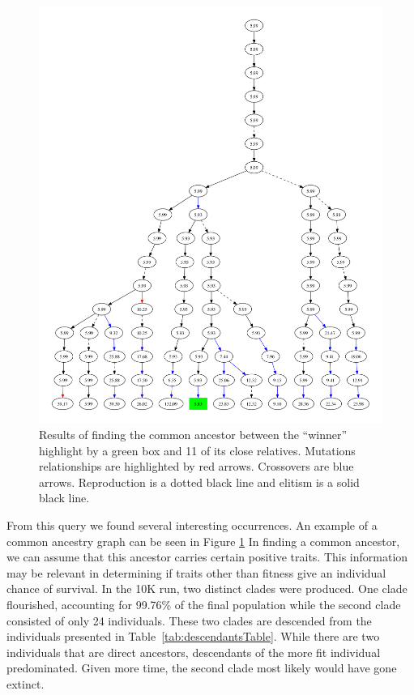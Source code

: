 \documentclass[12pt]{article}
\begin{document}
\begin{figure}[tb]
 \centering
 \includegraphics[width= \textwidth]{subset_confluence_trimmed}
 \caption{Results of finding the common ancestor  between the ``winner'' highlight by a green box and 11 of its close relatives. Mutations relationships are highlighted by red arrows. Crossovers are blue arrows. Reproduction is a dotted black line and elitism is a solid black line.}
 \label{fig:ancestryGraph}
\end{figure}

From this query we found several interesting occurrences. An example of a common ancestry graph can be seen in Figure \ref{fig:ancestryGraph} In finding a common ancestor, we can assume that this ancestor carries certain positive traits. This information may be relevant in determining if traits other than fitness give an individual  chance of survival. In the 10K run, two distinct clades were produced. One clade flourished, accounting for 99.76\% of the final population while the second clade consisted of only 24 individuals. These two clades are descended from the individuals presented in Table~\ref{tab:descendantsTable}. While there are two individuals that are direct ancestors, descendants of the more fit individual predominated. Given more time, the second clade most likely would have gone extinct.
\end{document}
